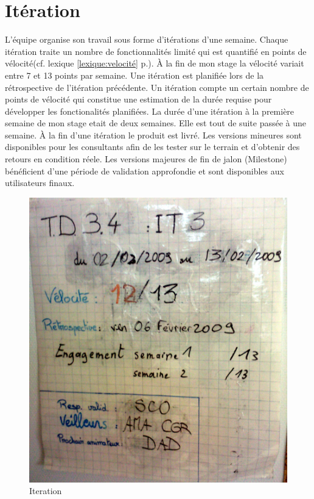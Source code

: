 \section{Itération}
L'équipe organise son travail sous forme d'itérations d'une semaine. Chaque itération traite un nombre de fonctionnalités limité qui est quantifié en points de vélocité(cf. lexique \ref{lexique:velocité} p.\pageref{lexique:velocité}). À la fin de mon stage la vélocité variait entre 7 et 13 points par semaine. Une itération est planifiée lors de la rétrospective de l'itération précédente. Un itération compte un certain nombre de points de vélocité qui constitue une estimation de la durée requise pour développer les fonctionalités planifiées. La durée d'une itération à la première semaine de mon stage etait de deux semaines. Elle est tout de suite passée à une semaine. À la fin d'une itération le produit est livré. Les versions mineures sont disponibles pour les consultants afin de les tester sur le terrain et d'obtenir des retours en condition réele. Les versions majeures de fin de jalon (Milestone) bénéficient d'une période de validation approfondie et sont disponibles aux utilisateurs finaux.

\begin{figure}[!ht]
\centering
\includegraphics[scale=0.10]{Illustrations/SP_A0182.jpg}
\caption{Iteration}
\label{fig:Iteration}
\end{figure}

